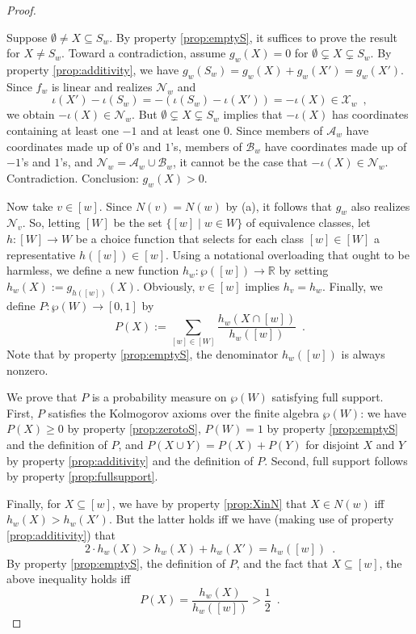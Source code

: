 \documentclass[12pt]{article}
\theoremstyle{definition}
\begin{document}
\begin{proof}
\begin{enumerate}
    Suppose $\emptyset\neq X\subseteq S_w$. By property
    \ref{prop:emptyS}, it suffices to prove the result for $X\neq
    S_w$. Toward a contradiction, assume $g_w(X)=0$ for
    $\emptyset\subsetneq X\subsetneq S_w$.  By property
    \ref{prop:additivity}, we have
    $g_w(S_w)=g_w(X)+g_w(X')=g_w(X')$.  Since
    $f_w$ is linear and realizes $\mathcal{N}_w$ and
    \[
    \iota(X')-\iota(S_w) = -(\iota(S_w)-\iota(X')) =
    -\iota(X)\in\mathcal{X}_w\enspace,
    \]
    we obtain $-\iota(X)\in\mathcal{N}_w$.  But
    $\emptyset\subsetneq X\subsetneq S_w$ implies that $-\iota(X)$
    has coordinates containing at least one $-1$ and at least one $0$.
    Since members of $\mathcal{A}_w$ have coordinates made up of
    $0$'s and $1$'s, members of $\mathcal{B}_w$ have coordinates
    made up of $-1$'s and $1$'s, and
    $\mathcal{N}_w=\mathcal{A}_w \cup \mathcal{B}_w$, it
    cannot be the case that $-\iota(X)\in\mathcal{N}_w$.
    Contradiction.  Conclusion: $g_w(X)>0$.
  \end{enumerate}

  Now take $v\in[w]$.  Since $N(v)=N(w)$ by (a), it follows that $g_w$
  also realizes $\mathcal{N}_{v}$.  So, letting $[W]$ be the set
  $\{[w]\mid w\in W\}$ of equivalence classes, let $h:[W]\to W$ be a
  choice function that selects for each class $[w]\in[W]$ a
  representative $h([w])\in[w]$. Using a notational overloading that ought
  to be harmless, we define a new function $h_w:\wp([w])\to\mathbb{R}$
  by setting $h_w(X):=g_{h([w])}(X)$.  Obviously, $v\in[w]$ implies
  $h_{v}=h_w$.  Finally, we define $P:\wp(W)\to[0,1]$ by
  \[
  P(X):= \sum_{[w]\in[W]} \frac {h_w(X\cap[w])}
  {h_w([w])}\enspace.
  \]
  Note that by property \ref{prop:emptyS}, the denominator
  $h_w([w])$ is always nonzero.

  We prove that $P$ is a probability measure on $\wp(W)$ satisfying
  full support. First, $P$ satisfies the Kolmogorov axioms over the
  finite algebra $\wp(W)$: we have $P(X)\geq 0$ by property
  \ref{prop:zerotoS}, $P(W)=1$ by property \ref{prop:emptyS} and the
  definition of $P$, and $P(X\cup Y)=P(X)+P(Y)$ for disjoint
  $X$ and $Y$ by property \ref{prop:additivity} and the definition of
  $P$.  Second, full support follows by property
  \ref{prop:fullsupport}.

  Finally, for $X\subseteq[w]$, we have by property \ref{prop:XinN}
  that $X\in N(w)$ iff $h_w(X)>h_w(X')$.  But the latter
  holds iff we have (making use of property \ref{prop:additivity})
  that
  \[
  2\cdot h_w(X)>h_w(X)+h_w(X')=h_w([w])\enspace.
  \]
  By property \ref{prop:emptyS}, the definition of $P$, and the fact
  that $X\subseteq[w]$, the above inequality holds iff
  \[
  P(X)=\frac{h_w(X)}{h_w([w])}>\textstyle \frac
  12\enspace.
  \]
\end{proof}
\end{document}
